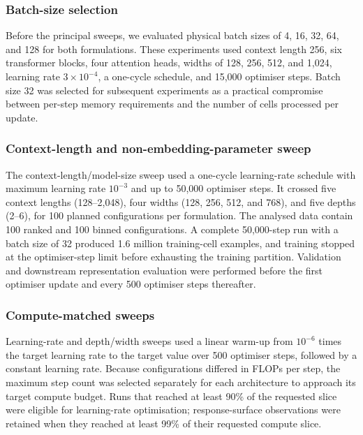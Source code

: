 \documentclass[pdflatex,sn-nature]{sn-jnl}%
\theoremstyle{thmstyleone}%
\theoremstyle{thmstyletwo}%
\theoremstyle{thmstylethree}%
\begin{document}
\subsubsection{Batch-size selection}

Before the principal sweeps, we evaluated physical batch sizes of 4, 16, 32, 64, and 128 for both formulations.
These experiments used context length 256, six transformer blocks, four attention heads, widths of 128, 256, 512, and 1,024, learning rate \(3\times10^{-4}\), a one-cycle schedule, and 15,000 optimiser steps.
Batch size 32 was selected for subsequent experiments as a practical compromise between per-step memory requirements and the number of cells processed per update.

\subsubsection{Context-length and non-embedding-parameter sweep}

The context-length/model-size sweep used a one-cycle learning-rate schedule with maximum learning rate \(10^{-3}\) and up to 50,000 optimiser steps.
It crossed five context lengths (128--2,048), four widths (128, 256, 512, and 768), and five depths (2--6), for 100 planned configurations per formulation.
The analysed data contain 100 ranked and 100 binned configurations.
A complete 50,000-step run with a batch size of 32 produced 1.6 million training-cell examples, and training stopped at the optimiser-step limit before exhausting the training partition.
Validation and downstream representation evaluation were performed before the first optimiser update and every 500 optimiser steps thereafter.

\subsubsection{Compute-matched sweeps}

Learning-rate and depth/width sweeps used a linear warm-up from \(10^{-6}\) times the target learning rate to the target value over 500 optimiser steps, followed by a constant learning rate.
Because configurations differed in FLOPs per step, the maximum step count was selected separately for each architecture to approach its target compute budget.
Runs that reached at least 90\% of the requested slice were eligible for learning-rate optimisation; response-surface observations were retained when they reached at least 99\% of their requested compute slice.
\end{document}
